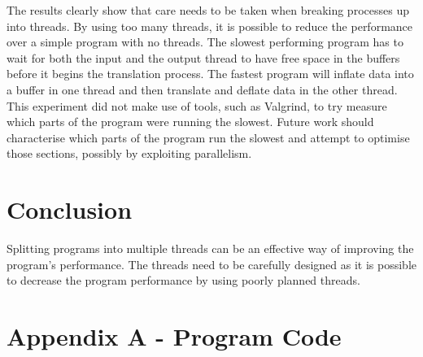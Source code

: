 \documentclass[a4paper,12pt]{article}
\begin{document}
The results clearly show that care needs to be taken when breaking processes up into threads.
By using too many threads, it is possible to reduce the performance over a simple program with no threads.
The slowest performing program has to wait for both the input and the output thread to have free space in the buffers before it begins the translation process.
The fastest program will inflate data into a buffer in one thread and then translate and deflate data in the other thread.
This experiment did not make use of tools, such as Valgrind, to try measure which parts of the program were running the slowest.
Future work should characterise which parts of the program run the slowest and attempt to optimise those sections, possibly by exploiting parallelism.

\section{Conclusion}
Splitting programs into multiple threads can be an effective way of improving the program's performance.
The threads need to be carefully designed as it is possible to decrease the program performance by using poorly planned threads.

\newpage

\section{Appendix A - Program Code}
\end{document}

